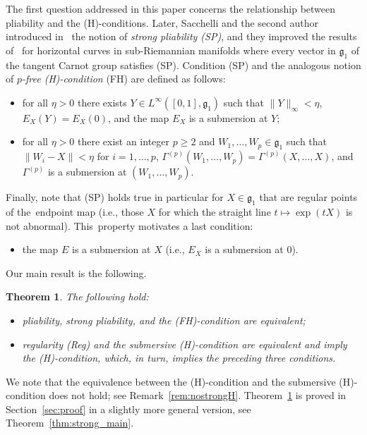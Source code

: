 \documentclass[10pt,a4paper]{amsart}
\numberwithin{equation}{section}
\newtheorem{Theorem}{Theorem}[section]
\theoremstyle{definition}
\begin{document}
The first question addressed in this paper concerns the relationship
between pliability and the (H)-conditions.
Later, Sacchelli and the second author introduced in~\cite{SS18} the notion of {\em strong pliability {\rm (SP)}}, and they improved the results of~\cite{Juillet-Sigalotti} for horizontal curves in sub-Riemannian manifolds where every vector in ${\mathfrak g}_1$ of the tangent Carnot group satisfies (SP). Condition (SP) and the analogous notion of \emph{$p$-free {\rm (H)}-condition} (FH) are defined as follows:
\begin{itemize}\itemsep=0pt\setlength{\leftskip}{0.05cm}
 \item[(SP)] for all $\eta>0$ there exists $Y\in L^\infty([0,1],{\mathfrak g}_1)$ such that $\|Y\|_\infty<\eta$, $E_X(Y)=E_X(0)$, and the map $E_X$ is a submersion at $Y$;
 \item[(FH)] for all $\eta>0$ there exist an integer $p\ge 2$ and $W_1,\dots,W_p\in {\mathfrak g}_1$ such that $\|W_i-X\|<\eta$ for $i=1,\dots,p$, $\Gamma^{(p)} (W_1,\dots,W_p) = \Gamma^{(p)} (X, \dots, X)$, and $\Gamma^{(p)}$ is a submersion at $(W_1,\dots,W_p)$.
\end{itemize}

Finally, note that (SP) holds true in particular for $X\in{\mathfrak g}_1$ that are regular points of the~endpoint map
(i.e., those $X$ for which the straight line $t \mapsto \exp (tX)$ is not abnormal). This~property motivates a last condition:
\begin{itemize}\itemsep=0pt\setlength{\leftskip}{0.15cm}
 \item[(Reg)] the map $E$ is a submersion at $X$ (i.e., $E_X$ is a submersion at $0$).
\end{itemize}

Our main result is the following.

\begin{Theorem}\label{thm:main} The following hold:
\begin{itemize}\itemsep=0pt
 \item pliability, strong pliability,
 and the {\rm (FH)}-condition are equivalent;
 \item regularity {\rm (Reg)} and the submersive {\rm (H)}-condition are equivalent and imply the {\rm (H)}-con\-di\-tion, which, in turn, implies
 the preceding three conditions.
\end{itemize}
\end{Theorem}

We note that the equivalence between the (H)-condition and the submersive (H)-condition does not hold; see Remark~\ref{rem:nostrongH}.
Theorem~\ref{thm:main} is proved in Section~\ref{sec:proof} in a slightly more general version, see Theorem~\ref{thm:strong_main}.
\end{document}
